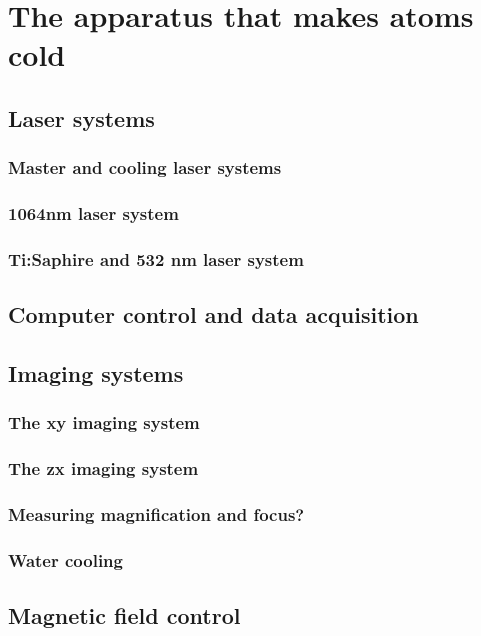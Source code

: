 
\renewcommand{\thechapter}{4}

\chapter{The apparatus that makes atoms cold}



\section{Laser systems}
\subsection{Master and cooling laser systems}
\subsection{1064nm laser system}
\subsection{Ti:Saphire and 532 nm laser system}
\section{Computer control and data acquisition
}
\section{Imaging systems}
\subsection{The xy imaging system}
\subsection{The zx imaging system}
\subsection{Measuring magnification and focus?}

\subsection{Water cooling}

\section{Magnetic field control}
